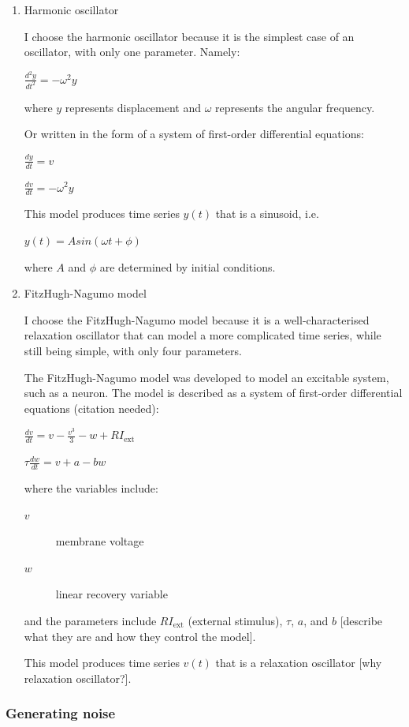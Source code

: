 \begin{enumerate}
\item Harmonic oscillator
\label{sec:org7f23d98}

I choose the harmonic oscillator because it is the simplest case of an oscillator, with only one parameter.  Namely:

\(\frac{d^{2}y}{dt^{2}} = -\omega^{2}y\)

where \(y\) represents displacement and \(\omega\) represents the angular frequency.

Or written in the form of a system of first-order differential equations:

\(\frac{dy}{dt} = v\)

\(\frac{dv}{dt} = -\omega^{2}y\)

This model produces time series \(y(t)\) that is a sinusoid, i.e.

\(y(t) = A sin(\omega{}t + \phi)\)

where \(A\) and \(\phi\) are determined by initial conditions.

\item FitzHugh-Nagumo model
\label{sec:orgdffb616}

I choose the FitzHugh-Nagumo model because it is a well-characterised relaxation oscillator that can model a more complicated time series, while still being simple, with only four parameters.

The FitzHugh-Nagumo model was developed to model an excitable system, such as a neuron.  The model is described as a system of first-order differential equations (citation needed):

\(\frac{dv}{dt} = v - \frac{v^3}{3} - w + RI_{\mathrm{ext}}\)

\(\tau \frac{dw}{dt} = v + a - bw\)

where the variables include:
\begin{description}
\item[{\(v\)}] membrane voltage
\item[{\(w\)}] linear recovery variable
\end{description}

and the parameters include \(RI_{\mathrm{ext}}\) (external stimulus), \(\tau\), \(a\), and \(b\) [describe what they are and how they control the model].

This model produces time series \(v(t)\) that is a relaxation oscillator [why relaxation oscillator?].
\end{enumerate}

\subsubsection{Generating noise}
\label{sec:analysis-correlation-maths-noise}

